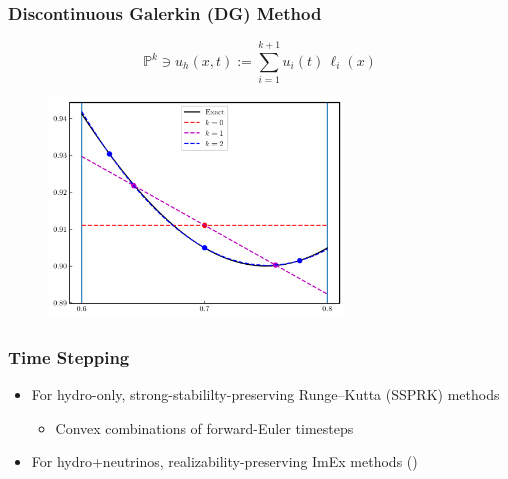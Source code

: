 \documentclass{beamer}
\begin{document}
\begin{frame}
\frametitle{Discontinuous Galerkin (DG) Method}

  \Fontvi

  \begin{equation*}
    \mathbb{P}^{k} \ni u_{h}\left(x,t\right)
    :=\sum\limits_{i=1}^{k+1}
      u_{i}\left(t\right)\,\ell_{i}\left(x\right)
  \end{equation*}

  \begin{figure}[htb!]
    \centering
    \includegraphics[width=0.7\textwidth]{fig.DG_1D.png}
  \end{figure}

\end{frame}

\begin{frame}
\frametitle{Time Stepping}

  \begin{itemize}
    \item
      For hydro-only, strong-stabililty-preserving Runge--Kutta (SSPRK)
      methods
      \begin{itemize}
        \item
          Convex combinations of forward-Euler timesteps
      \end{itemize}
    \item
      For hydro+neutrinos, realizability-preserving ImEx methods
      (\citet{ceh2019})
  \end{itemize}

\end{frame}
\end{document}
